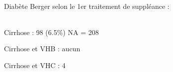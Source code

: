 \documentclass[11pt,a4paper]{article}\usepackage[]{graphicx}\usepackage[]{color}
\begin{document}
% 
% 
% 
% 
% 
~\\

Diabète Berger selon le 1er traitement de suppléance :


~\\

Cirrhose : 98 (6.5\%) NA = 208

Cirrhose et VHB : aucun

Cirrhose et VHC : 4
\end{document}

